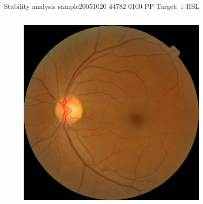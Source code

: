 \documentclass{beamer}
\begin{document}
\begin{frame}{Stability analysis sample}{20051020 44782 0100 PP Target: 1 HSL}
\begin{columns}
	\begin{column}{0.3\textwidth}
		\begin{figure}[p]
			\centering
			\includegraphics[width=\textwidth]{chapter_stability/20051020_44782_0100_PP/20051020_44782_0100_PP.jpeg}
		\end{figure}	
	\end{column}
	\begin{column}{0.45\textwidth}  %
		\begin{figure}[p]
			\centering

\end{figure}
\end{column}
\end{columns}
\end{frame}
\end{document}
